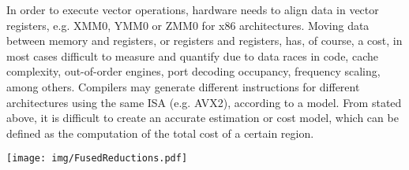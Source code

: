 In order to execute vector operations, hardware needs to align data in vector
registers, e.g. XMM0, YMM0 or ZMM0 for x86 architectures. Moving data between
memory and registers, or registers and registers, has, of course, a cost,
in most cases difficult to measure and quantify due to data races in code,
cache complexity, out-of-order engines, port decoding occupancy, frequency
scaling, among others. Compilers may generate different instructions for
different architectures using the same ISA (e.g. AVX2), according to a model.
From stated above, it is difficult to create an accurate estimation or cost
model, which can be defined as the computation of the total cost of a certain
region.

\begin{figure*}[ht]
	\centering
	\texttt{[image: img/FusedReductions.pdf]}
	\caption{}
	\label{fig:FusedReductions}
\end{figure*}